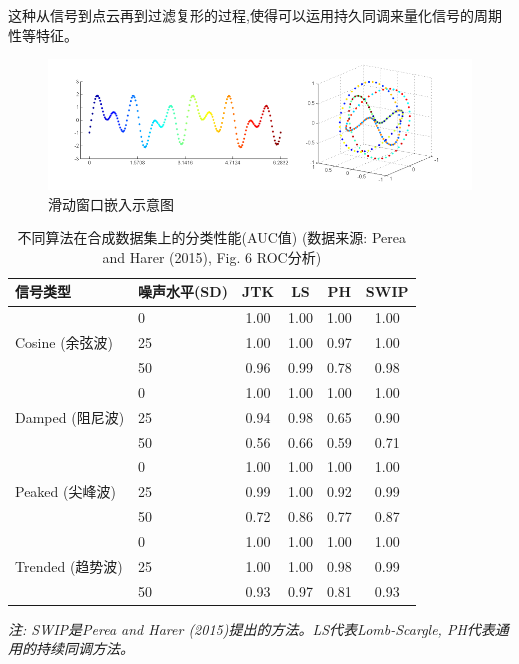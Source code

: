 这种从信号到点云再到过滤复形的过程,使得可以运用持久同调来量化信号的周期性等特征。

\begin{figure}[thbp!]
    \centering
    \includegraphics[width=.9\textwidth]{figure/滑动窗口嵌入示意图、.png}
    \caption{滑动窗口嵌入示意图}
\end{figure}


\begin{table}[htbp]
    \centering
    \caption{不同算法在合成数据集上的分类性能(AUC值) (数据来源: Perea and Harer (2015), Fig. 6 ROC分析)}
    \label{tab:perea_auc_results}
    \begin{tabular}{llcccc}
        \toprule
        信号类型                           & 噪声水平(SD) & JTK  & LS   & PH   & SWIP \\
        \midrule
        \multirow{3}{*}{Cosine (余弦波)}  & 0        & 1.00 & 1.00 & 1.00 & 1.00 \\
                                       & 25       & 1.00 & 1.00 & 0.97 & 1.00 \\
                                       & 50       & 0.96 & 0.99 & 0.78 & 0.98 \\
        \midrule
        \multirow{3}{*}{Damped (阻尼波)}  & 0        & 1.00 & 1.00 & 1.00 & 1.00 \\
                                       & 25       & 0.94 & 0.98 & 0.65 & 0.90 \\
                                       & 50       & 0.56 & 0.66 & 0.59 & 0.71 \\
        \midrule
        \multirow{3}{*}{Peaked (尖峰波)}  & 0        & 1.00 & 1.00 & 1.00 & 1.00 \\
                                       & 25       & 0.99 & 1.00 & 0.92 & 0.99 \\
                                       & 50       & 0.72 & 0.86 & 0.77 & 0.87 \\
        \midrule
        \multirow{3}{*}{Trended (趋势波)} & 0        & 1.00 & 1.00 & 1.00 & 1.00 \\
                                       & 25       & 1.00 & 1.00 & 0.98 & 0.99 \\
                                       & 50       & 0.93 & 0.97 & 0.81 & 0.93 \\
        \bottomrule
    \end{tabular}
    \par
    \textit{注: SWIP是Perea and Harer (2015)提出的方法。LS代表Lomb-Scargle, PH代表通用的持续同调方法。}
\end{table}

